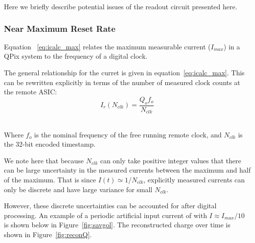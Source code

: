 Here we briefly describe potential issues of the readout circuit presented here.

\subsubsection{Near Maximum Reset Rate}

Equation ~\ref{eq:icalc_max} relates the maximum measurable current ($I_{max}$) in a QPix system to the frequency of a digital clock.

The general relationship for the curret is given in equation~\ref{eq:icalc_max}.
This can be rewritten explicitly in terms of the number of measured clock counts at the remote ASIC:
\begin{equation}
  I_{r}(N_{clk}) = \frac{Q_{o}f_{o}}{N_{clk}}
\end{equation}~\label{eq:i_clk}

Where $f_{o}$ is the nominal frequency of the free running remote clock, and $N_{clk}$ is the 32-bit encoded timestamp.

We note here that because $N_{clk}$ can only take positive integer values that there can be large uncertainty in the measured currents between the maximum and half of the maximum.
That is since $I(t) \simeq 1/N_{clk}$, explicitly measured currents can only be discrete and have large variance for small $N_{clk}$.

However, these discrete uncertainties can be accounted for after digital processing.
An example of a periodic artificial input current of with $I \approx I_{max}/10$ is shown below in Figure~\ref{fig:savgol}.
The reconstructed charge over time is shown in Figure~\ref{fig:reconQ}.


